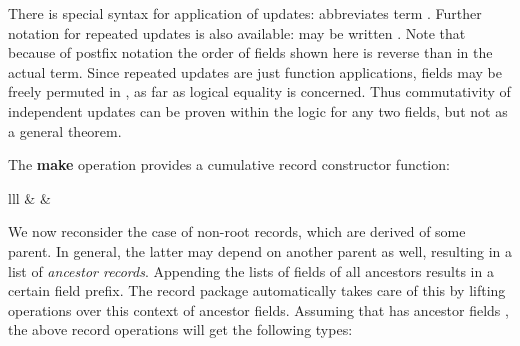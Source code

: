 \begin{isabellebody}
\begin{isamarkuptext}
  There is special syntax for application of updates:  abbreviates term .  Further notation for
  repeated updates is also available:  may be written .  Note that
  because of postfix notation the order of fields shown here is
  reverse than in the actual term.  Since repeated updates are just
  function applications, fields may be freely permuted in , as far as logical equality is concerned.
  Thus commutativity of independent updates can be proven within the
  logic for any two fields, but not as a general theorem.

  \medskip The \textbf{make} operation provides a cumulative record
  constructor function:

  \begin{matharray}{lll}
     & \isa{{\isachardoublequote}{\isacharcolon}{\isacharcolon}{\isachardoublequote}} &  \\
  \end{matharray}

  \medskip We now reconsider the case of non-root records, which are
  derived of some parent.  In general, the latter may depend on
  another parent as well, resulting in a list of \emph{ancestor
  records}.  Appending the lists of fields of all ancestors results in
  a certain field prefix.  The record package automatically takes care
  of this by lifting operations over this context of ancestor fields.
  Assuming that  has ancestor
  fields ,
  the above record operations will get the following types:


\end{isamarkuptext}
\end{isabellebody}
